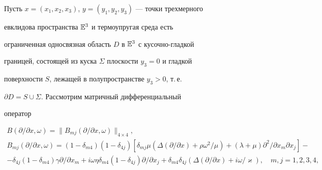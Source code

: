 \date{} 




\pagestyle{plain} %


 




\maketitle 


\label{begin} 


 


Пусть $x=(x_1,x_2,x_3)$, $y=(y_1,y_2,y_3)$ --- точки трехмерного 


евклидова пространства $\Bbb E^3$ и термоупругая среда есть 


ограниченная односвязная область $D$ в $\Bbb E^3$ с кусочно-гладкой 


границей, состоящей из куска $\Sigma$ плоскости $y_3=0$ и гладкой 


поверхности $S$, лежащей в полупространстве $y_3>0$, т.\,е. 


$\partial D=S\cup\Sigma$. Рассмотрим матричный дифференциальный 


оператор 


\begin{gather*} 


B(\partial/\partial x,\omega)=\|B_{mj}(\partial/\partial x, 


\omega)\|_{4\times 4},\\ 


B_{mj}(\partial/\partial x,\omega)=(1-\delta_{m4})(1-\delta_{4j}) 


[\delta_{mj}\mu(\Delta(\partial/\partial x)+\rho\omega^2/\mu)+ 


(\lambda+\mu)\partial^2/\partial x_m\partial x_j]-\\ 


-\delta_{4j}(1-\delta_{m4})\gamma\partial/\partial x_m+ 


i\omega\eta\delta_{m4}(1-\delta_{4j}) 


\partial/\partial x_j+\delta_{m4}\delta_{4j} 


(\Delta(\partial/\partial x)+i\omega/\varkappa), 


\quad m,j=1,2,3,4, 


\end{gather*} 


